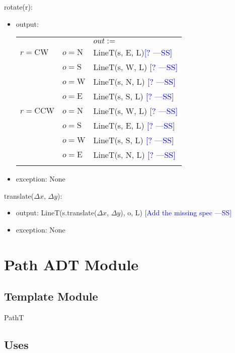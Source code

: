 \documentclass[12pt]{article}
\newcommand{\authornote}[3]{\textcolor{#1}{[#3 ---#2]}}
\newcommand{\authornote}[3]{}
\newcommand{\wss}[1]{\authornote{blue}{SS}{#1}}
\begin{document}
\noindent rotate(r):
\begin{itemize}
\item output: 
\begin{tabular}{|p{}|p{2.3cm}|l|}
\hhline{~|~|-|}
\multicolumn{1}{r}{} & \multicolumn{1}{r|}{} & \multicolumn{1}{l|}{$out :=$}\\
\hhline{|-|-|-|}
$r = \mbox{CW}$ & $o = \mbox{N}$ & LineT(s, E, L)\wss{?}\\
\hhline{|~|-|-|}
~ & $o = \mbox{S}$ & LineT(s, W, L) \wss{?}\\
\hhline{|~|-|-|}
~ & $o = \mbox{W}$ & LineT(s, N, L) \wss{?}\\
\hhline{|~|-|-|}
~ & $o = \mbox{E}$ & LineT(s, S, L) \wss{?}\\
\hhline{-|-|-|}
$r = \mbox{CCW}$ & $o = \mbox{N}$ & LineT(s, W, L) \wss{?}\\
\hhline{|~|-|-|}
~ & $o = \mbox{S}$ & LineT(s, E, L) \wss{?}\\
\hhline{|~|-|-|}
~ & $o = \mbox{W}$ & LineT(s, S, L) \wss{?}\\
\hhline{|~|-|-|}
~ & $o = \mbox{E}$ & LineT(s, N, L) \wss{?}\\
\hhline{-|-|-|}
\end{tabular}

\item exception: None
\end{itemize}

\noindent translate($\Delta x$, $\Delta y$):
\begin{itemize}
\item output: LineT(s.translate($\Delta x$, $\Delta y$), o, L) \wss{Add the missing spec}
\item exception: None
\end{itemize}

\newpage

\section* {Path ADT Module}

\subsection*{Template Module}

PathT

\subsection* {Uses}
\end{document}
